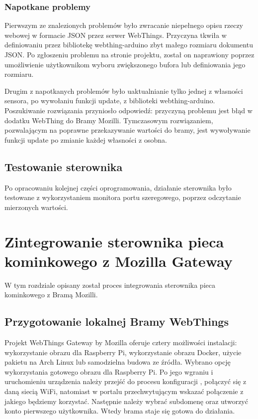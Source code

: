 \documentclass[11pt]{report}
\begin{document}
 \subsection{Napotkane problemy}
 Pierwszym ze znalezionych problemów było zwracanie niepełnego opisu rzeczy webowej w formacie JSON przez serwer WebThings. Przyczyna tkwiła w definiowaniu przez bibliotekę webthing-arduino zbyt małego rozmiaru dokumentu JSON. Po zgłoszeniu problemu na stronie projektu, został on naprawiony poprzez umożliwienie użytkownikom wyboru zwiększonego bufora lub definiowania jego rozmiaru.
 
 Drugim z napotkanych problemów było uaktualnianie tylko jednej z własności sensora, po wywołaniu funkcji update, z biblioteki webthing-arduino. Poszukiwanie rozwiązania przyniosło odpowiedź: przyczyną problemu jest błąd w dodatku WebThing do Bramy Mozilli. Tymczasowym rozwiązaniem, pozwalającym na poprawne przekazywanie wartości do bramy, jest wywoływanie funkcji update po zmianie każdej własności z osobna.

 \section{Testowanie sterownika}
 Po opracowaniu kolejnej części oprogramowania, działanie sterownika było testowane z wykorzystaniem monitora portu szeregowego, poprzez odczytanie mierzonych wartości.


 \chapter[Zintegrowanie sterownika pieca kominkowego\\ z Mozilla Gateway]{Zintegrowanie sterownika pieca kominkowego z Mozilla Gateway}\label{ch:gateway}
 W tym rozdziale opisany został proces integrowania sterownika pieca kominkowego z Bramą Mozilli.
 
 \section{Przygotowanie lokalnej Bramy WebThings}
  Projekt WebThings Gateway by Mozilla oferuje cztery możliwości instalacji: wykorzystanie obrazu dla Raspberry Pi, wykorzystanie obrazu Docker, użycie pakietu na Arch Linux lub samodzielna budowa ze źródła. Wybrano opcję wykorzystania gotowego obrazu dla Raspberry Pi.
  Po jego wgraniu i uruchomieniu urządzenia należy przejść do procesu konfiguracji \cite{gatewaystarted2019}, połączyć się z daną siecią WiFi, natomiast w portalu przechwytującym wskazać połączenie z jakiego będziemy korzystać. Następnie należy wybrać subdomenę oraz utworzyć konto pierwszego użytkownika. Wtedy brama staje się gotowa do działania.
\end{document}
